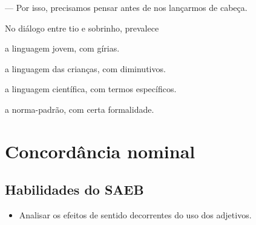 \begin{conteudo}
\begin{conteudo}
\begin{conteudo}
\begin{conteudo}
\begin{conteudo}
\begin{myquote}
--- Por isso, precisamos pensar antes de nos lançarmos de cabeça.

\end{myquote}

No diálogo entre tio e sobrinho, prevalece

\begin{escolha}
\item a linguagem jovem, com gírias.

\item a linguagem das crianças, com diminutivos.

\item a linguagem científica, com termos específicos.

\item a norma-padrão, com certa formalidade.
\end{escolha}

\chapter{Concordância nominal}


\section*{Habilidades do SAEB}

\begin{itemize}
  \item Analisar os efeitos de sentido decorrentes do uso dos adjetivos.


\end{itemize}
\end{conteudo}
\end{conteudo}
\end{conteudo}
\end{conteudo}
\end{conteudo}
